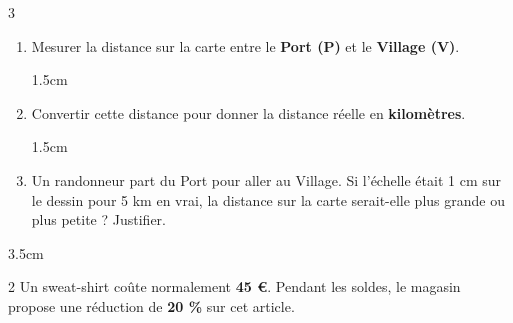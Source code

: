 \documentclass[a4paper]{book}
\begin{document}
{\begin{exerciceNote}{3}
\begin{center}
        \end{center}

        \begin{enumerate}[leftmargin=*]
            \item Mesurer la distance sur la carte entre le \textbf{Port (P)} et le \textbf{Village (V)}. 

            \begin{ZoneReponse}{1.5cm}
            \end{ZoneReponse}

            \medskip
            
            \item Convertir cette distance pour donner la distance réelle en \textbf{kilomètres}.

            \begin{ZoneReponse}{1.5cm}
            \end{ZoneReponse}
            
            \medskip
            
            \item Un randonneur part du Port pour aller au Village. Si l'échelle était 1 cm sur le dessin pour 5 km en vrai, la distance sur la carte serait-elle plus grande ou plus petite ? Justifier.
        \end{enumerate}

        \begin{ZoneReponse}{3.5cm}
        \end{ZoneReponse}
    \end{exerciceNote}
    

    \begin{exerciceNote}{2}
        Un sweat-shirt coûte normalement \textbf{45 \euro}. Pendant les soldes, le magasin propose une réduction de \textbf{20 \%} sur cet article.


\end{exerciceNote}}
\end{document}
